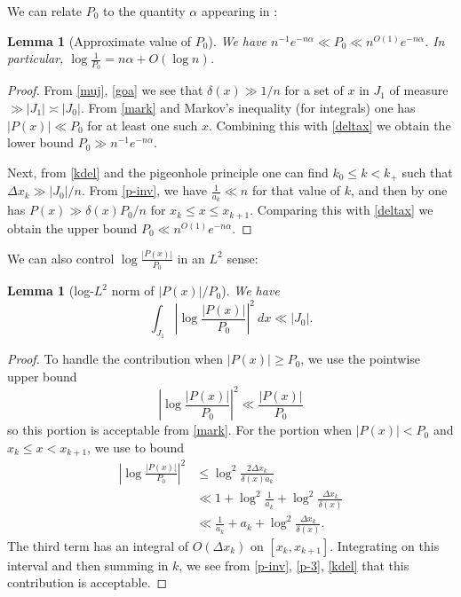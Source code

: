 \documentclass[12pt]{amsart}
\newtheorem{lemma}[theorem]{Lemma}
\begin{document}
We can relate $P_0$ to the quantity $\alpha$ appearing in :

\begin{lemma}[Approximate value of $P_0$]\label{lem-P0} We have $n^{-1} e^{-n\alpha} \ll P_0 \ll n^{O(1)} e^{-n\alpha}$.  In particular, $\log \frac{1}{P_0} = n\alpha + O(\log n)$.
\end{lemma}

\begin{proof}  From \eqref{muj}, \eqref{goa} we see that $\delta(x) \gg 1/n$ for a set of $x$ in $J_1$ of measure $\gg |J_1| \asymp |J_0|$.  From \eqref{mark} and Markov's inequality (for integrals) one has $|P(x)| \ll P_0$ for at least one such $x$.  Combining this with \eqref{deltax} we obtain the lower bound $P_0 \gg n^{-1} e^{-n\alpha}$.

Next, from \eqref{kdel} and the pigeonhole principle one can find $k_0 \leq k < k_+$ such that $\Delta x_k \gg |J_0|/n$.  From \eqref{p-inv}, we have $\frac{1}{a_k} \ll n$ for that value of $k$, and then by
 one has $P(x) \gg \delta(x) P_0 / n$ for $x_k \leq x \leq x_{k+1}$.  Comparing this with \eqref{deltax} we obtain the upper bound $P_0 \ll n^{O(1)} e^{-n\alpha}$.
\end{proof}

We can also control $\log \frac{|P(x)|}{P_0}$ in an $L^2$ sense:

\begin{lemma}[log-$L^2$ norm of $|P(x)|/P_0$]\label{lem-log} We have
    $$ \int_{J_1} \left|\log \frac{|P(x)|}{P_0}\right|^2\ dx \ll |J_0|.$$
\end{lemma}

\begin{proof}  To handle the contribution when $|P(x)| \geq P_0$, we use the pointwise upper bound
$$ \left|\log \frac{|P(x)|}{P_0}\right|^2 \ll \frac{|P(x)|}{P_0}$$
so this portion is acceptable from \eqref{mark}.  For the portion when $|P(x)| < P_0$ and $x_k \leq x < x_{k+1}$, we use  to bound
\begin{align*}
 \left|\log \frac{|P(x)|}{P_0}\right|^2 &\leq \log^2 \frac{2 \Delta x_k}{\delta(x) a_k}\\
 &\ll 1 + \log^2 \frac{1}{a_k} + \log^2 \frac{\Delta x_k}{\delta(x)} \\
 &\ll \frac{1}{a_k} + a_k + \log^2 \frac{\Delta x_k}{\delta(x)}.
\end{align*}
The third term has an integral of $O(\Delta x_k)$ on $[x_k,x_{k+1}]$.  Integrating on this interval and then summing in $k$, we see from \eqref{p-inv}, \eqref{p-3}, \eqref{kdel} that this contribution is acceptable.
\end{proof}
\end{document}

